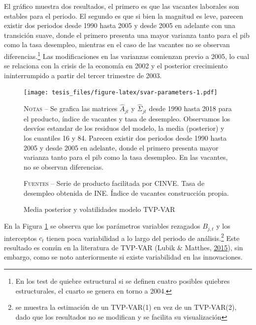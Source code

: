 \documentclass[12pt,oneside]{reedthesis}
\begin{document}
El gráfico muestra dos resultados, el primero es que las vacantes laborales son estables para el periodo. El segundo es que si bien la magnitud es leve, parecen existir dos periodos desde 1990 hasta 2005 y desde 2005 en adelante con una transición suave, donde el primero presenta una mayor varianza tanto para el pib como la tasa desempleo, mientras en el caso de las vacantes no se observan diferencias.\footnote{En los test de quiebre estructural si se definen cuatro posibles quiebres estructurales, el cuarto se genera en torno a 2004.} Las modificaciones en las varianzas comienzan previo a 2005, lo cual se relaciona con la crisis de la economía en 2002 y el posterior crecimiento ininterrumpido a partir del tercer trimestre de 2003.
\begin{landscape}
\begin{figure}
\texttt{[image: tesis\_files/figure-latex/svar-parameters-1.pdf]}
\caption{Media posterior y volatilidades modelo TVP-VAR}\label{fig:svar-parameters}\textsc{}

\footnotesize\textsc{Notas} -- Se grafica las matrices $\hat{A}_{jt}$ y $\hat{\Sigma}_{jt}$ desde 1990 hasta 2018 para el producto, índice de vacantes y tasa de desempleo. Observamos los desvíos estandar de los residuos del modelo, la media (posterior) y los cuantiles 16 y 84. Parecen existir dos periodos desde 1990 hasta 2005 y desde 2005 en adelante, donde el primero presenta mayor varianza tanto para el pib como la tasa desempleo. En las vacantes, no se observan diferencias.

\textsc{Fuentes} -- Serie de producto facilitada por CINVE. Tasa de desempleo obtenida de INE. Índice de vacantes construcción propia.
\end{figure}
\end{landscape}
En la Figura \ref{fig:svar-parameters} se observa que los parámetros variables rezagados \(B_{j,t}\) y los interceptos \(c_{t}\) tienen poca variabilidad a lo largo del periodo de análisis.\footnote{se muestra la estimación de un TVP-VAR(1) en vez de un TVP-VAR(2), dado que los resultados no se modifican y se facilita su visualización} Este resultado es común en la literatura de TVP-VAR (Lubik \& Matthes, \protect\hyperlink{ref-Lubik2016b}{2015}), sin embargo, como se noto anteriormente si existe variabilidad en las innovaciones.
\end{document}
